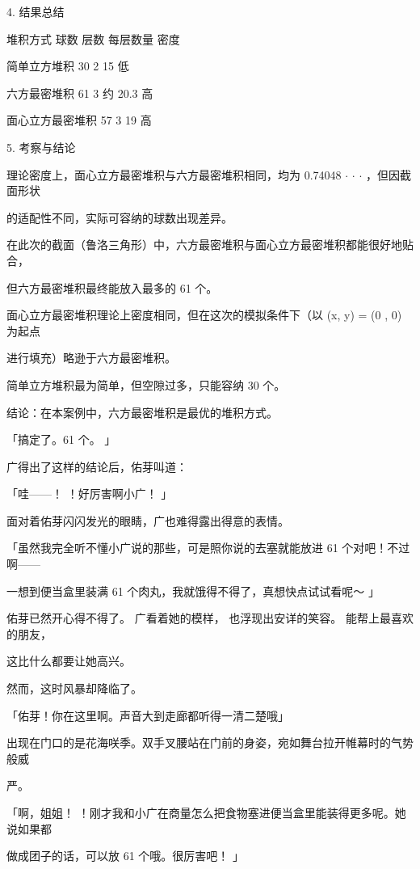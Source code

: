 4. 结果总结\par
堆积方式 球数 层数 每层数量 密度\par
简单立方堆积 30 2 15 低\par
六方最密堆积 61 3 约 20.3 高\par
面心立方最密堆积 57 3 19 高\par
5. 考察与结论\par
理论密度上，面心立方最密堆积与六方最密堆积相同，均为 0.74048 $\cdot$ $\cdot$ $\cdot$ ，但因截面形状\par
的适配性不同，实际可容纳的球数出现差异。\par
在此次的截面（鲁洛三角形）中，六方最密堆积与面心立方最密堆积都能很好地贴合，\par
但六方最密堆积最终能放入最多的 61 个。\par
面心立方最密堆积理论上密度相同，但在这次的模拟条件下（以 (x, y) = (0 , 0) 为起点\par
进行填充）略逊于六方最密堆积。\par
简单立方堆积最为简单，但空隙过多，只能容纳 30 个。\par
结论：在本案例中，六方最密堆积是最优的堆积方式。\par
「搞定了。61 个。 」\par
广得出了这样的结论后，佑芽叫道：\par
「哇——！ ！好厉害啊小广！ 」\par
面对着佑芽闪闪发光的眼睛，广也难得露出得意的表情。\par
「虽然我完全听不懂小广说的那些，可是照你说的去塞就能放进 61 个对吧！不过啊——\par
一想到便当盒里装满 61 个肉丸，我就饿得不得了，真想快点试试看呢～ 」\par
佑芽已然开心得不得了。 广看着她的模样， 也浮现出安详的笑容。 能帮上最喜欢的朋友，\par
这比什么都要让她高兴。\par
然而，这时风暴却降临了。\par
「佑芽！你在这里啊。声音大到走廊都听得一清二楚哦」\par
出现在门口的是花海咲季。双手叉腰站在门前的身姿，宛如舞台拉开帷幕时的气势般威\par
严。\par
「啊，姐姐！ ！刚才我和小广在商量怎么把食物塞进便当盒里能装得更多呢。她说如果都\par
做成团子的话，可以放 61 个哦。很厉害吧！ 」\par

